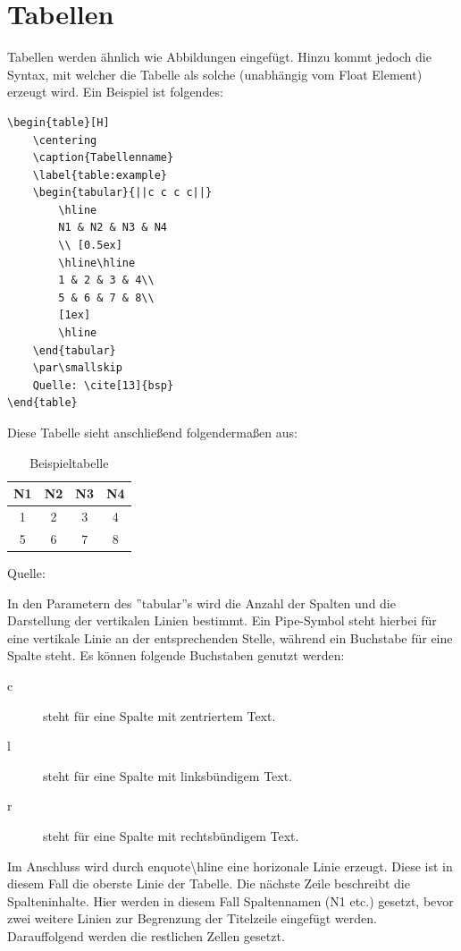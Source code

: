 \section{Tabellen}
Tabellen werden ähnlich wie Abbildungen eingefügt. Hinzu kommt jedoch die Syntax, mit welcher die Tabelle als solche (unabhängig vom Float Element) erzeugt wird. Ein Beispiel ist folgendes:
\begin{lstlisting}
\begin{table}[H]
	\centering
	\caption{Tabellenname}
	\label{table:example}
	\begin{tabular}{||c c c c||}
		\hline
		N1 & N2 & N3 & N4
		\\ [0.5ex]
		\hline\hline
		1 & 2 & 3 & 4\\
		5 & 6 & 7 & 8\\
		[1ex]
		\hline
	\end{tabular}
	\par\smallskip 
	Quelle: \cite[13]{bsp}
\end{table}
\end{lstlisting}

Diese Tabelle sieht anschließend folgendermaßen aus:
\begin{table}[H]
	\centering
	\caption{Beispieltabelle}
	\label{table:example}
	\begin{tabular}{||c c c c||}
		\hline
		N1 & N2 & N3 & N4
		\\ [0.5ex]
		\hline\hline
		1 & 2 & 3 & 4\\
		5 & 6 & 7 & 8\\
		[1ex]
		\hline
	\end{tabular}
	\par\smallskip 
	Quelle: \cite[13]{bsp}
\end{table}
In den Parametern des ''tabular''s wird die Anzahl der Spalten und die Darstellung der vertikalen Linien bestimmt. Ein Pipe-Symbol steht hierbei für eine vertikale Linie an der entsprechenden Stelle, während ein Buchstabe für eine Spalte steht. Es können folgende Buchstaben genutzt werden:
\begin{description}
	\item[c] steht für eine Spalte mit zentriertem Text.
	\item[l] steht für eine Spalte mit linksbündigem Text.
	\item[r] steht für eine Spalte mit rechtsbündigem Text.
\end{description}

Im Anschluss wird durch enquote{\textbackslash hline} eine horizonale Linie erzeugt. Diese ist in diesem Fall die oberste Linie der Tabelle. Die nächste Zeile beschreibt die Spalteninhalte. Hier werden in diesem Fall Spaltennamen (N1 etc.) gesetzt, bevor zwei weitere Linien zur Begrenzung der Titelzeile eingefügt werden. Darauffolgend werden die restlichen Zellen gesetzt.